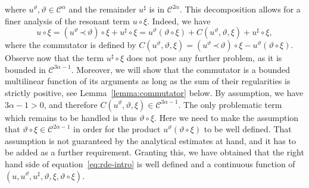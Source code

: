 \documentclass[a4paper,11pt]{article}
\theoremstyle{remark}
\newcommand{\CC}{\ensuremath{\mathscr{C}}}
\newcommand{\lpara}{\,\mathord{\prec}\,}
\newcommand{\reso}{\,\mathord{\circ}\,}
\begin{document}
where $u^{\vartheta} , \vartheta \in \CC^{\alpha}$ and the remainder
$u^{\sharp}$ is in $\CC^{2 \alpha}$. This decomposition allows for a finer analysis
of the resonant term $u \reso \xi$. Indeed, we have
\begin{equation}\label{eq:rde expand resonant term}
   u \reso   \xi = ( u^{\vartheta} \lpara \vartheta ) \reso   \xi +u^{\sharp} \reso   \xi =u^{\vartheta} ( \vartheta \reso \xi ) +C ( u^{\vartheta} , \vartheta , \xi ) +u^{\sharp} \reso   \xi ,
\end{equation}
where the commutator is defined by $C ( u^{\vartheta} ,\vartheta , \xi ) = ( u^{\vartheta} \lpara \vartheta ) \reso \xi -u^{\vartheta}( \vartheta \reso \xi )$. %
Observe now that the term $u^{\sharp} \reso   \xi$
does not pose any further problem, as it is bounded in $\CC^{3 \alpha -1}$.
Moreover, we will show that the commutator is a bounded multilinear function of its arguments as
long as the sum of their regularities is strictly positive, see
Lemma~\ref{lemma:commutator} below. By assumption, we have $3 \alpha -1>0$,
and therefore $C ( u^{\vartheta} , \vartheta , \xi ) \in \CC^{3 \alpha -1}$.
The only problematic term which remains to be handled is thus $\vartheta \reso   \xi$. Here we need to make the assumption that $\vartheta \reso \xi \in \CC^{2 \alpha -1}$ in order for the product $u^{\vartheta} (\vartheta \reso   \xi )$ to be well defined. That assumption is not guaranteed
by the analytical estimates at hand, and it has to be added as a
further requirement. Granting this, we have obtained that the right hand side
of equation~{\eqref{eq:rde-intro}} is well defined and a continuous function of $(u,u^{\vartheta} ,u^{\sharp} , \vartheta , \xi , \vartheta \reso \xi )$.
\end{document}
